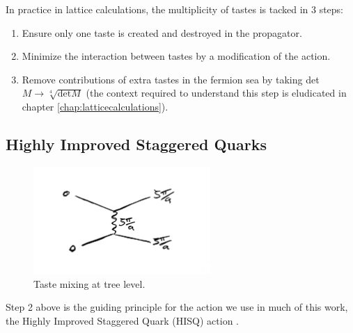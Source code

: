     In practice in lattice calculations, the multiplicity of tastes is tacked in 3 steps:
    \begin{enumerate}
    \item
      Ensure only one taste is created and destroyed in the propagator.
    \item
      Minimize the interaction between tastes by a modification of the action.
    \item
      Remove contributions of extra tastes in the fermion sea by taking det$M \to \sqrt[4]{\text{det}M}$ (the context required to understand this step is eludicated in chapter \ref{chap:latticecalculations}).
    \end{enumerate}


    \subsection{Highly Improved Staggered Quarks}
    \label{sec:HISQ}

    \begin{figure}
      \vspace{-10pt}
      \begin{center}
        \includegraphics[width=
          0.6\textwidth]{images/taste_exchange.jpg}
      \end{center}
      \vspace{-30pt}
      \caption{Taste mixing at tree level.}
      \label{fig:tastemixing}
    \end{figure}

    Step 2 above is the guiding principle for the action we use in much of this work, the Highly Improved Staggered Quark (HISQ) action \cite{Follana:2006rc}.

